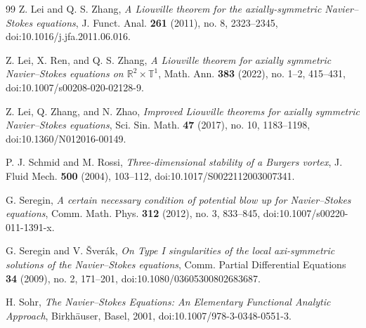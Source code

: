 \documentclass[11pt]{amsart}
\theoremstyle{plain}
\theoremstyle{definition}
\theoremstyle{remark}
\numberwithin{equation}{section}
\begin{document}
\begin{thebibliography}{99}
Z. Lei and Q. S. Zhang,
\emph{A Liouville theorem for the axially-symmetric Navier--Stokes equations},
J. Funct. Anal. \textbf{261} (2011), no. 8, 2323--2345,
doi:10.1016/j.jfa.2011.06.016.

Z. Lei, X. Ren, and Q. S. Zhang,
\emph{A Liouville theorem for axially symmetric Navier--Stokes equations on
\(\mathbb R^2\times\mathbb T^1\)},
Math. Ann. \textbf{383} (2022), no. 1--2, 415--431,
doi:10.1007/s00208-020-02128-9.

Z. Lei, Q. Zhang, and N. Zhao,
\emph{Improved Liouville theorems for axially symmetric Navier--Stokes
equations},
Sci. Sin. Math. \textbf{47} (2017), no. 10, 1183--1198,
doi:10.1360/N012016-00149.

P. J. Schmid and M. Rossi,
\emph{Three-dimensional stability of a Burgers vortex},
J. Fluid Mech. \textbf{500} (2004), 103--112,
doi:10.1017/S0022112003007341.

G. Seregin,
\emph{A certain necessary condition of potential blow up for Navier--Stokes
equations},
Comm. Math. Phys. \textbf{312} (2012), no. 3, 833--845,
doi:10.1007/s00220-011-1391-x.

G. Seregin and V. \v{S}ver\'ak,
\emph{On Type I singularities of the local axi-symmetric solutions of the
Navier--Stokes equations},
Comm. Partial Differential Equations \textbf{34} (2009), no. 2, 171--201,
doi:10.1080/03605300802683687.

H. Sohr,
\emph{The Navier--Stokes Equations: An Elementary Functional Analytic
Approach},
Birkh\"auser, Basel, 2001,
doi:10.1007/978-3-0348-0551-3.

\end{thebibliography}
\end{document}
